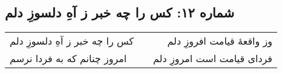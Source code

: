 \begin{center}
\section*{شماره ۱۲: کس را چه خبر ز آهِ دلسوزِ دلم}
\label{sec:012}
\begin{longtable}{l p{0.5cm} r}
کس را چه خبر ز آهِ دلسوزِ دلم
&&
وز واقعهٔ قیامت افروزِ دلم
\\
امروز چنانم که به فردا نرسم
&&
فردای قیامت است امروزِ دلم
\\
\end{longtable}
\end{center}
